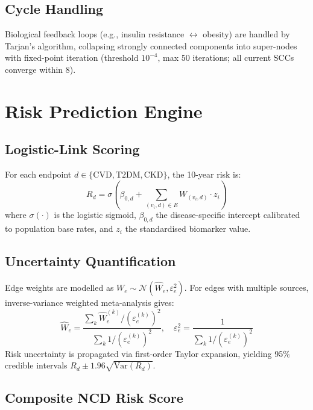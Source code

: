 \documentclass[runningheads]{llncs}
\begin{document}
\subsection{Cycle Handling}\label{sec:cycles}

Biological feedback loops (e.g., insulin resistance
$\leftrightarrow$ obesity) are handled by Tarjan's algorithm,
collapsing strongly connected components into super-nodes with
fixed-point iteration (threshold $10^{-4}$, max 50 iterations;
all current SCCs converge within 8).

\section{Risk Prediction Engine}\label{sec:risk}

\subsection{Logistic-Link Scoring}\label{sec:logistic}

For each endpoint $d \in \{\text{CVD}, \text{T2DM}, \text{CKD}\}$,
the 10-year risk is:
\begin{equation}\label{eq:risk}
R_d = \sigma\!\left(\beta_{0,d} + \sum_{(v_i, d) \in E} W_{(v_i,d)} \cdot z_i\right)
\end{equation}
where $\sigma(\cdot)$ is the logistic sigmoid, $\beta_{0,d}$ the
disease-specific intercept calibrated to population base rates, and
$z_i$ the standardised biomarker value.

\subsection{Uncertainty Quantification}\label{sec:uncert}

Edge weights are modelled as $W_e \sim \mathcal{N}(\hat{W}_e,
\varepsilon_e^2)$.
For edges with multiple sources, inverse-variance weighted
meta-analysis gives:
\begin{equation}\label{eq:meta}
\hat{W}_e = \frac{\sum_k \hat{W}_e^{(k)} / (\varepsilon_e^{(k)})^2}
{\sum_k 1 / (\varepsilon_e^{(k)})^2}, \quad
\varepsilon_e^2 = \frac{1}{\sum_k 1 / (\varepsilon_e^{(k)})^2}
\end{equation}
Risk uncertainty is propagated via first-order Taylor expansion,
yielding 95\% credible intervals $R_d \pm 1.96\sqrt{\mathrm{Var}(R_d)}$.

\subsection{Composite NCD Risk Score}\label{sec:composite}
\end{document}
